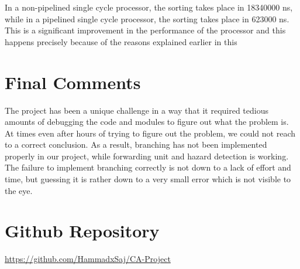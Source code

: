 \documentclass{article}
\begin{document}
In a non-pipelined single cycle processor, the sorting takes place in 18340000 ns, while in a pipelined single cycle processor, the sorting takes place in 623000 ns. This is a significant improvement in the performance of the processor and this happens precisely because of the reasons explained earlier in this

\section{Final Comments}
The project has been a unique challenge in a way that it required tedious amounts of debugging the code and modules to figure out what the problem is. At times even after hours of trying to figure out the problem, we could not reach to a correct conclusion. As a result, branching has not been implemented properly in our project, while forwarding unit and hazard detection is working. The failure to implement branching correctly is not down to a lack of effort and time, but guessing it is rather down to a very small error which is not visible to the eye. 


\section{Github Repository}

\href{https://github.com/HammadxSaj/CA-Project}{https://github.com/HammadxSaj/CA-Project}
\end{document}
